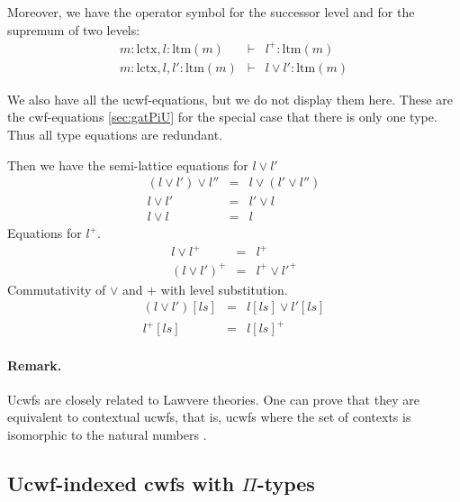 \documentclass[11pt,a4paper]{article}
\theoremstyle{definition}
\def\lctx{\mathrm{lctx}}
\def\ltm{\mathrm{ltm}}
\begin{document}
Moreover, we have the operator symbol for the successor level and for the supremum of two levels:
\begin{eqnarray*}
m : \lctx, l : \ltm(m) &\vdash& l^+ : \ltm(m)\\
m : \lctx, l,l' : \ltm(m) &\vdash& l \vee l' : \ltm(m)
\end{eqnarray*}

We also have all the ucwf-equations, but we do not display them here. These are the cwf-equations  \ref{sec:gatPiU} for the special case that there is only one type. Thus all type equations are redundant.

Then we have the semi-lattice equations for $l \vee l'$
\begin{eqnarray*}
(l \vee l') \vee l'' &=& l \vee (l' \vee l'')\\
l \vee l' &=& l'\vee l\\
l \vee l &=& l
\end{eqnarray*}
Equations for $l^+$.
\begin{eqnarray*}
l \vee l^+ &=& l^+\\
(l\vee l')^+ &=& l^+\vee l'^+
\end{eqnarray*}
Commutativity of $\vee$ and $+$ with level substitution.
\begin{eqnarray*}
(l \vee l')[ls] &=& l[ls] \vee l' [ls]\\
 l^+[ls] &=&  l[ls]^+
\end{eqnarray*}
\paragraph{Remark.} Ucwfs are closely related to Lawvere theories. One can prove that they are equivalent to contextual ucwfs, that is, ucwfs where the set of contexts is isomorphic to the natural numbers \cite{CCD:lambek}.

\subsection{Ucwf-indexed cwfs  with $\Pi$-types}
\end{document}
